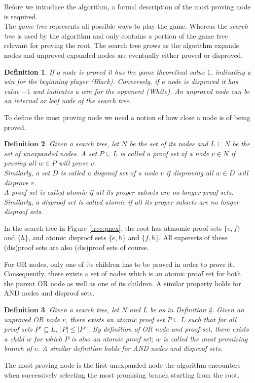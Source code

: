 \documentclass{article}
\newtheorem{mydef}{Definition}
\begin{document}
Before we introduce the algorithm, a formal description of the most proving node is required.\\
The \textit{game tree} represents all possible ways to play the game. Whereas the \textit{search tree} is used by the algorithm
and only contains a portion of the game tree relevant for proving the root. The search tree grows as the algorithm expands nodes and
unproved expanded nodes are eventually either proved or disproved.
\begin{mydef}
If a node is proved it has the game theoretical value $1$, indicating a win for the beginning player (Black).
Conversely, if a node is disproved it has value $-1$ and indicates a win for the opponent (White).
An unproved node can be an internal or leaf node of the search tree.
\end{mydef}

To define the most proving node we need a notion of how close a node is of being proved.
\begin{mydef}
Given a search tree, let $N$ be the set of its nodes and $L \subseteq N$ be the set of unexpanded nodes. A set $P \subseteq L$ is called a proof set of a node $v \in N$ if proving all $w \in P$ will prove $v$.\\
Similarly, a set $D$ is called a disproof set of a node $v$ if disproving all $w \in D$ will disprove $v$.\\
A proof set is called atomic if all its proper subsets are no longer proof sets.\\
Similarly, a disproof set is called atomic if all its proper subsets are no longer disproof sets.
\label{def:pset}
\end{mydef}
In the search tree in Figure \ref{tree:pnex}, the root has atmomic proof sets $\{e, f\}$ and $\{h\}$,
and atomic disproof sets $\{e, h\}$ and $\{f, h\}$. All supersets of these (dis)proof sets are also (dis)proof sets of course.

For OR nodes, only one of its children has to be proved in order to prove it. Consequently, there exists a set of nodes which is an atomic
proof set for both the parent OR node as well as one of its children. A similar property holds for AND nodes and disproof sets.
\begin{mydef}
Given a search tree, let $N$ and $L$ be as in Definition \ref{def:pset}.
Given an unproved OR node $v$, there exists an atomic proof set $P \subseteq L$ such that for all proof sets $P' \subseteq L$, $|P| \leq |P'|$.
By definition of OR node and proof set, there exists a child $w$ for which $P$ is also an atomic proof set; $w$ is called the most promising branch
of $v$. A similar definition holds for AND nodes and disproof sets.
\end{mydef}
The most proving node is the first unexpanded node the algorithm encounters when successively selecting the most promising branch starting from
the root.
\end{document}
